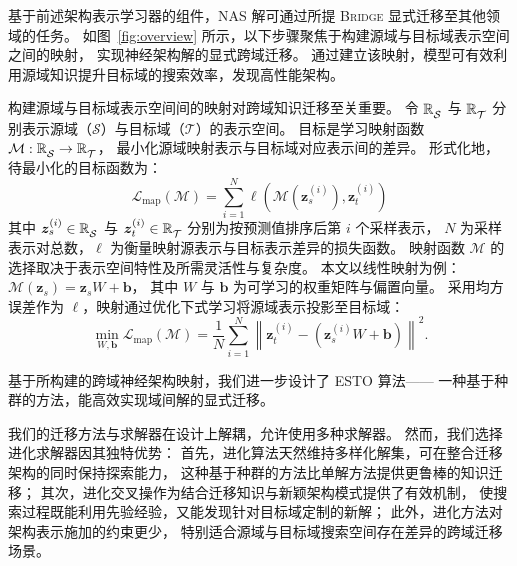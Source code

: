 \documentclass[../main.tex]{subfiles}
\begin{document}
基于前述架构表示学习器的组件，NAS 解可通过所提 \textsc{Bridge} 显式迁移至其他领域的任务。
如图~\ref{fig:overview} 所示，以下步骤聚焦于构建源域与目标域表示空间之间的映射，
实现神经架构解的显式跨域迁移。
通过建立该映射，模型可有效利用源域知识提升目标域的搜索效率，发现高性能架构。

构建源域与目标域表示空间间的映射对跨域知识迁移至关重要。
令 $ \mathbb{R}^{\mathstrut}_{\mathcal{S}} $ 与 $ \mathbb{R}^{\mathstrut}_{\mathcal{T}} $ 分别表示源域（$ \mathcal{S} $）与目标域（$ \mathcal{T} $）的表示空间。
目标是学习映射函数 $ \mathcal{M}: \mathbb{R}^{\mathstrut}_{\mathcal{S}} \rightarrow \mathbb{R}^{\mathstrut}_\mathcal{T} $，
最小化源域映射表示与目标域对应表示间的差异。
形式化地，待最小化的目标函数为：
\begin{equation}
	\mathcal{L}_\mathrm{map}(\mathcal{M}) = \sum_{i=1}^{N}{\ell\left(\mathcal{M}(\bm{z}_{s}^{(i)}),\bm{z}_{t}^{(i)}\right)}
\end{equation}
其中 $ \bm{z}^{(i)}_{s} \in \mathbb{R}^{\mathstrut}_{\mathcal{S}} $ 与 $ \bm{z}^{(i)}_{t} \in \mathbb{R}^{\mathstrut}_{\mathcal{T}} $ 分别为按预测值排序后第 $ i $ 个采样表示，
$ N $ 为采样表示对总数，$ \ell $ 为衡量映射源表示与目标表示差异的损失函数。
映射函数 $ \mathcal{M} $ 的选择取决于表示空间特性及所需灵活性与复杂度。
本文以线性映射为例：$ \mathcal{M}(\bm{z}_{s}) = \bm{z}_{s}W + \bm{b} $，
其中 $ W $ 与 $ \bm{b} $ 为可学习的权重矩阵与偏置向量。
采用均方误差作为 $ \ell $，映射通过优化下式学习将源域表示投影至目标域：
\begin{equation}
	\min_{W,\mathbf{b}} \mathcal{L}_\mathrm{map}(\mathcal{M}) = \frac{1}{N}\sum_{i=1}^{N}{\left\|\bm{z}_{t}^{(i)} - \left(\bm{z}_{s}^{(i)}W + \bm{b}\right)\right\|}^{2}.
\end{equation}

\label{sec:ch4-7-progressive-transfer-nas-across-spaces}

基于所构建的跨域神经架构映射，我们进一步设计了 ESTO 算法——
一种基于种群的方法，能高效实现域间解的显式迁移。

我们的迁移方法与求解器在设计上解耦，允许使用多种求解器。
然而，我们选择进化求解器因其独特优势：
首先，进化算法天然维持多样化解集，可在整合迁移架构的同时保持探索能力，
这种基于种群的方法比单解方法提供更鲁棒的知识迁移；
其次，进化交叉操作为结合迁移知识与新颖架构模式提供了有效机制，
使搜索过程既能利用先验经验，又能发现针对目标域定制的新解；
此外，进化方法对架构表示施加的约束更少，
特别适合源域与目标域搜索空间存在差异的跨域迁移场景。
\end{document}
